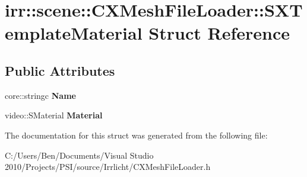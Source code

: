 \hypertarget{structirr_1_1scene_1_1_c_x_mesh_file_loader_1_1_s_x_template_material}{\section{irr\-:\-:scene\-:\-:C\-X\-Mesh\-File\-Loader\-:\-:S\-X\-Template\-Material Struct Reference}
\label{structirr_1_1scene_1_1_c_x_mesh_file_loader_1_1_s_x_template_material}
}
\subsection*{Public Attributes}
\begin{DoxyCompactItemize}
\item 
\hypertarget{structirr_1_1scene_1_1_c_x_mesh_file_loader_1_1_s_x_template_material_aff607b0630d73e55051b4d0df646fd55}{core\-::stringc {\bfseries Name}}\label{structirr_1_1scene_1_1_c_x_mesh_file_loader_1_1_s_x_template_material_aff607b0630d73e55051b4d0df646fd55}

\item 
\hypertarget{structirr_1_1scene_1_1_c_x_mesh_file_loader_1_1_s_x_template_material_af642ae238f3b32ffa1b25310e9777076}{video\-::\-S\-Material {\bfseries Material}}\label{structirr_1_1scene_1_1_c_x_mesh_file_loader_1_1_s_x_template_material_af642ae238f3b32ffa1b25310e9777076}

\end{DoxyCompactItemize}


The documentation for this struct was generated from the following file\-:\begin{DoxyCompactItemize}
\item 
C\-:/\-Users/\-Ben/\-Documents/\-Visual Studio 2010/\-Projects/\-P\-S\-I/source/\-Irrlicht/C\-X\-Mesh\-File\-Loader.\-h\end{DoxyCompactItemize}
